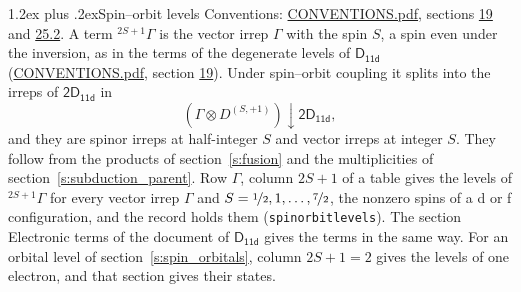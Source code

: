 \documentclass[10pt,a4paper]{article}
\makeatletter
\renewcommand\section{\@startsection{section}{1}{\z@}{-3ex plus -1ex minus -.2ex}%
  {1.2ex plus .2ex}{\normalfont\large\sffamily\bfseries\color{parttitle}}}
\numberwithin{equation}{section}
\newcommand{\grp}[1]{\mathsf{#1}}
\newcommand{\restr}[2]{#1\!\downarrow#2}
\newcommand{\irrJp}[2]{D^{(#1,#2)}}
\newcommand{\irrprod}{\otimes}
\newcommand{\term}[2]{{}^{#1}#2}
\makeatother
\begin{document}
\section{Spin--orbit levels}\label{s:spin_orbit}
Conventions: \href{../../CONVENTIONS.pdf}{CONVENTIONS.pdf}, sections \href{../../../rotation/CONVENTIONS.pdf\#conv.19}{19} and \href{../../CONVENTIONS.pdf\#conv.25.2}{25.2}.
\leavevmode\label{n:local.spin}\label{n:symbol.term}A term $\term{2S+1}{\Gamma}$ is the vector irrep $\Gamma$ with the spin $S$, a spin even under the inversion, as in the terms of the degenerate levels of \href{../../../rotation/data/pdf/D11d.pdf}{$\grp{D_{11d}}$} (\href{../../CONVENTIONS.pdf}{CONVENTIONS.pdf}, section \href{../../../rotation/CONVENTIONS.pdf\#conv.19}{19}). Under spin--orbit coupling it splits into the irreps of $\grp{2D_{11d}}$ in
\begin{equation}\label{e:spinorbit}\restr{(\Gamma \irrprod \irrJp{S}{+1})}{\grp{2D_{11d}}},\end{equation}
and they are spinor irreps at half-integer $S$ and vector irreps at integer $S$. They follow from the products of section~\ref{s:fusion} and the multiplicities of section~\ref{s:subduction_parent}. Row $\Gamma$, column $2S + 1$ of a table gives the levels of $\term{2S+1}{\Gamma}$ for every vector irrep $\Gamma$ and $S = \nicefrac{1}{2}, 1, \dots, \nicefrac{7}{2}$, the nonzero spins of a d or f configuration, and the record holds them (\texttt{spinorbitlevels}). The section Electronic terms of the document of \href{../../../rotation/data/pdf/D11d.pdf}{$\grp{D_{11d}}$} gives the terms in the same way. For an orbital level of section~\ref{s:spin_orbitals}, column $2S + 1 = 2$ gives the levels of one electron, and that section gives their states.
\end{document}
